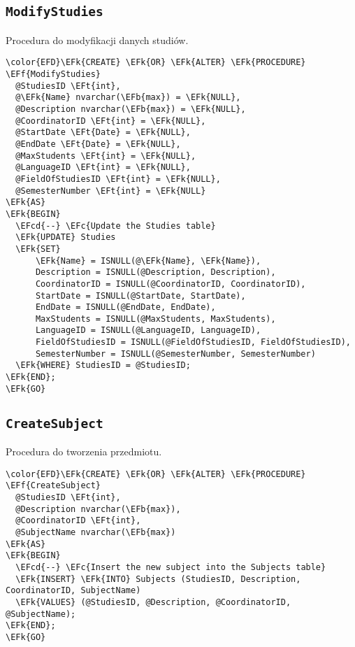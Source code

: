 \documentclass[11pt]{article}
\newcommand{\EFc}[1]{\textcolor{EFc}{\textit{#1}}} %
\newcommand{\EFcd}[1]{\textcolor{EFcd}{\textit{#1}}} %
\newcommand{\EFk}[1]{\textcolor{EFk}{\textbf{#1}}} %
\newcommand{\EFb}[1]{\textcolor{EFb}{\textbf{#1}}} %
\newcommand{\EFf}[1]{\textcolor{EFf}{#1}} %
\newcommand{\EFt}[1]{\textcolor{EFt}{\textbf{#1}}} %
\begin{document}
\subsection{\texttt{ModifyStudies}}
\label{sec:orgbb238e7}
Procedura do modyfikacji danych studiów.
\begin{Code}
\begin{Verbatim}
\color{EFD}\EFk{CREATE} \EFk{OR} \EFk{ALTER} \EFk{PROCEDURE} \EFf{ModifyStudies}
  @StudiesID \EFt{int},
  @\EFk{Name} nvarchar(\EFb{max}) = \EFk{NULL},
  @Description nvarchar(\EFb{max}) = \EFk{NULL},
  @CoordinatorID \EFt{int} = \EFk{NULL},
  @StartDate \EFt{Date} = \EFk{NULL},
  @EndDate \EFt{Date} = \EFk{NULL},
  @MaxStudents \EFt{int} = \EFk{NULL},
  @LanguageID \EFt{int} = \EFk{NULL},
  @FieldOfStudiesID \EFt{int} = \EFk{NULL},
  @SemesterNumber \EFt{int} = \EFk{NULL}
\EFk{AS}
\EFk{BEGIN}
  \EFcd{--} \EFc{Update the Studies table}
  \EFk{UPDATE} Studies
  \EFk{SET} 
      \EFk{Name} = ISNULL(@\EFk{Name}, \EFk{Name}),
      Description = ISNULL(@Description, Description),
      CoordinatorID = ISNULL(@CoordinatorID, CoordinatorID),
      StartDate = ISNULL(@StartDate, StartDate),
      EndDate = ISNULL(@EndDate, EndDate),
      MaxStudents = ISNULL(@MaxStudents, MaxStudents),
      LanguageID = ISNULL(@LanguageID, LanguageID),
      FieldOfStudiesID = ISNULL(@FieldOfStudiesID, FieldOfStudiesID),
      SemesterNumber = ISNULL(@SemesterNumber, SemesterNumber)
  \EFk{WHERE} StudiesID = @StudiesID;
\EFk{END};
\EFk{GO}
\end{Verbatim}
\end{Code}
\subsection{\texttt{CreateSubject}}
\label{sec:org7d3bd78}
Procedura do tworzenia przedmiotu.
\begin{Code}
\begin{Verbatim}
\color{EFD}\EFk{CREATE} \EFk{OR} \EFk{ALTER} \EFk{PROCEDURE} \EFf{CreateSubject}
  @StudiesID \EFt{int},
  @Description nvarchar(\EFb{max}),
  @CoordinatorID \EFt{int},
  @SubjectName nvarchar(\EFb{max})
\EFk{AS}
\EFk{BEGIN}
  \EFcd{--} \EFc{Insert the new subject into the Subjects table}
  \EFk{INSERT} \EFk{INTO} Subjects (StudiesID, Description, CoordinatorID, SubjectName)
  \EFk{VALUES} (@StudiesID, @Description, @CoordinatorID, @SubjectName);
\EFk{END};
\EFk{GO}
\end{Verbatim}
\end{Code}
\end{document}
